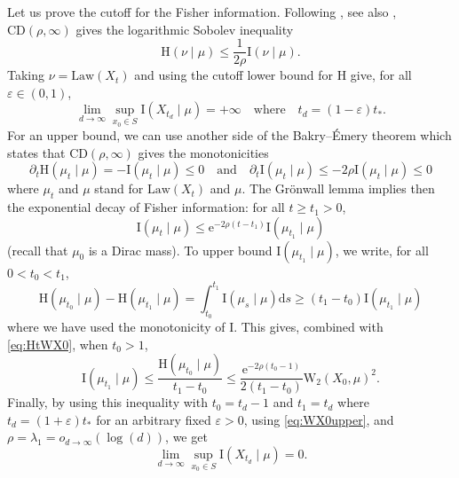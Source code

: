 \documentclass[10pt,reqno]{amsart}
\numberwithin{equation}{section}
\begin{document}
Let us prove the cutoff for the Fisher information.
Following \cite{BE85}, see also \cite{BGL14}, $\mathrm{CD}(\rho,\infty)$ gives the logarithmic Sobolev inequality  
\begin{equation}\label{eq:LSI}
  \mathrm{H}(\nu\mid\mu)\leq\frac{1}{2\rho}\mathrm{I}(\nu\mid\mu).
\end{equation}
Taking $\nu=\mathrm{Law}(X_t)$ and using the cutoff lower bound for $\mathrm{H}$ give, for all $\varepsilon\in(0,1)$, 
\begin{equation}\label{eq:I:lower}
  \lim_{d\to\infty}\sup_{x_0\in S}\mathrm{I}(X_{t_d}\mid\mu)=+\infty
  \quad\text{where}\quad
  t_d=(1-\varepsilon)t_*.
\end{equation}
For an upper bound, we can use another side of the Bakry--Émery theorem which states that $\mathrm{CD}(\rho,\infty)$ gives the monotonicities
\begin{equation}
  \partial_t\mathrm{H}(\mu_t\mid\mu)=-\mathrm{I}(\mu_t\mid\mu)\leq0
  \quad\text{and}\quad
  \partial_t\mathrm{I}(\mu_t\mid\mu)
  \leq-2\rho\mathrm{I}(\mu_t\mid\mu)\leq0
\end{equation}    
where $\mu_t$ and $\mu$ stand for $\mathrm{Law}(X_t)$ and
$\mu$. The Grönwall lemma implies then the exponential decay of
Fisher information: for all $t\geq t_1>0$,
\begin{equation}\label{eq:expdecI}
  \mathrm{I}(\mu_t\mid\mu)\leq\mathrm{e}^{-2\rho(t-t_1)}\mathrm{I}(\mu_{t_1}\mid\mu)
\end{equation}
(recall that $\mu_0$ is a Dirac mass). To upper bound $\mathrm{I}(\mu_{t_1}\mid\mu)$, we write, for all $0<t_0<t_1$,
\begin{equation}\label{eq:HI}
  \mathrm{H}(\mu_{t_0}\mid\mu)-\mathrm{H}(\mu_{t_1}\mid\mu)
  =\int_{t_0}^{t_1}\mathrm{I}(\mu_s\mid\mu)\mathrm{d}s
  \geq(t_1-t_0)\mathrm{I}(\mu_{t_1}\mid\mu)
\end{equation}
where we have used the monotonicity of $\mathrm{I}$. This gives, combined
with \eqref{eq:HtWX0}, when $t_0>1$,
\begin{equation} \label{eq_fisher_ent_w2}
  \mathrm{I}(\mu_{t_1}\mid\mu)
  \leq\frac{\mathrm{H}(\mu_{t_0}\mid\mu)}{t_1-t_0}
  \leq\frac{\mathrm{e}^{-2\rho(t_0-1)}}{2(t_1-t_0)}\mathrm{W}_2(X_0, \mu)^2.
\end{equation}
Finally, by using this inequality with $t_0=t_d-1$ and $t_1=t_d$ where
$t_d=(1+\varepsilon)t_*$ for an arbitrary fixed $\varepsilon>0$, using
\eqref{eq:WX0upper}, and $\rho=\lambda_1=o_{d\to\infty}(\log(d))$, we get
\begin{equation}\label{eq:I:upper}
  \lim_{d\to\infty}\sup_{x_0\in S}\mathrm{I}(X_{t_d}\mid\mu)=0.
\end{equation}
\end{document}
